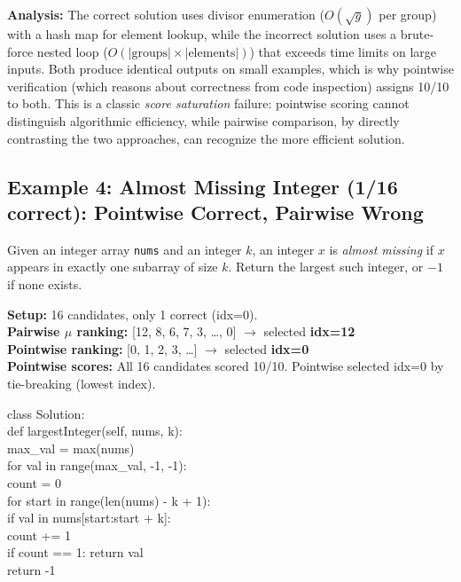 \noindent\textbf{Analysis:} The correct solution uses divisor enumeration ($O(\sqrt{g})$ per group) with a hash map for element lookup, while the incorrect solution uses a brute-force nested loop ($O(|\text{groups}| \times |\text{elements}|)$) that exceeds time limits on large inputs. Both produce identical outputs on small examples, which is why pointwise verification (which reasons about correctness from code inspection) assigns 10/10 to both. This is a classic \emph{score saturation} failure: pointwise scoring cannot distinguish algorithmic efficiency, while pairwise comparison, by directly contrasting the two approaches, can recognize the more efficient solution.


\subsection{Example 4: Almost Missing Integer (1/16 correct): Pointwise Correct, Pairwise Wrong}

\begin{tcolorbox}[
    colback=promptbg,
    colframe=promptborder,
    title={\textbf{Problem: Find the largest almost missing integer}},
    coltitle=white,
    fonttitle=\small\bfseries,
    breakable,
    enhanced
]
\small
Given an integer array \texttt{nums} and an integer $k$, an integer $x$ is \emph{almost missing} if $x$ appears in exactly one subarray of size $k$. Return the largest such integer, or $-1$ if none exists.
\end{tcolorbox}

\noindent\textbf{Setup:} 16 candidates, only 1 correct (idx=0).\\
\textbf{Pairwise $\mu$ ranking:} [12, 8, 6, 7, 3, \ldots, 0] $\rightarrow$ selected \textbf{idx=12} \\
\textbf{Pointwise ranking:} [0, 1, 2, 3, \ldots] $\rightarrow$ selected \textbf{idx=0} \checkmark\\
\textbf{Pointwise scores:} All 16 candidates scored 10/10. Pointwise selected idx=0 by tie-breaking (lowest index).

\begin{tcolorbox}[
    colback=green!5,
    colframe=green!60!black,
    title={\textbf{Pointwise-Selected Solution (idx=0): Correct \checkmark}},
    coltitle=white,
    fonttitle=\small\bfseries,
    breakable,
    enhanced
]
\small\ttfamily
class Solution:\\
\quad def largestInteger(self, nums, k):\\
\quad\quad max\_val = max(nums)\\
\quad\quad for val in range(max\_val, -1, -1):\\
\quad\quad\quad count = 0\\
\quad\quad\quad for start in range(len(nums) - k + 1):\\
\quad\quad\quad\quad if val in nums[start:start + k]:\\
\quad\quad\quad\quad\quad count += 1\\
\quad\quad\quad if count == 1: return val\\
\quad\quad return -1
\end{tcolorbox}

